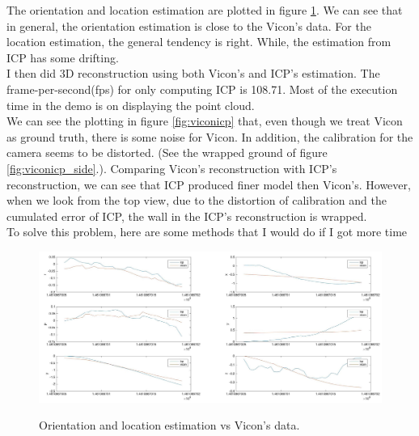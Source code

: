 \documentclass[letterpaper, 10 pt, conference]{ieeeconf}  %
\begin{document}
The orientation and location estimation are plotted in figure \ref{fig:loc}. We can see that in general, the orientation estimation is close to the Vicon's data. For the location estimation, the general tendency is right. While, the estimation from ICP has some drifting.\\
I then did 3D reconstruction using both Vicon's and ICP's estimation. The frame-per-second(fps) for only computing ICP is 108.71. Most of the execution time in the demo is on displaying the point cloud. \\
We can see the plotting in figure \ref{fig:viconicp} that, even though we treat Vicon as ground truth, there is some noise for Vicon. In addition, the calibration for the camera seems to be distorted. (See the wrapped ground of figure \ref{fig:viconicp_side}.). Comparing Vicon's reconstruction with ICP's reconstruction, we can see that ICP produced finer model then Vicon's. However, when we look from the top view, due to the distortion of calibration and the cumulated error of ICP, the wall in the ICP's reconstruction is wrapped. \\
To solve this problem, here are some methods that I would do if I got more time
\begin{figure}
\centering
\includegraphics[height=\columnwidth, angle =90 ]{may2localization.jpg}\\
\caption{Orientation and location estimation vs Vicon's data.}
\label{fig:loc}
\end{figure}
\end{document}
